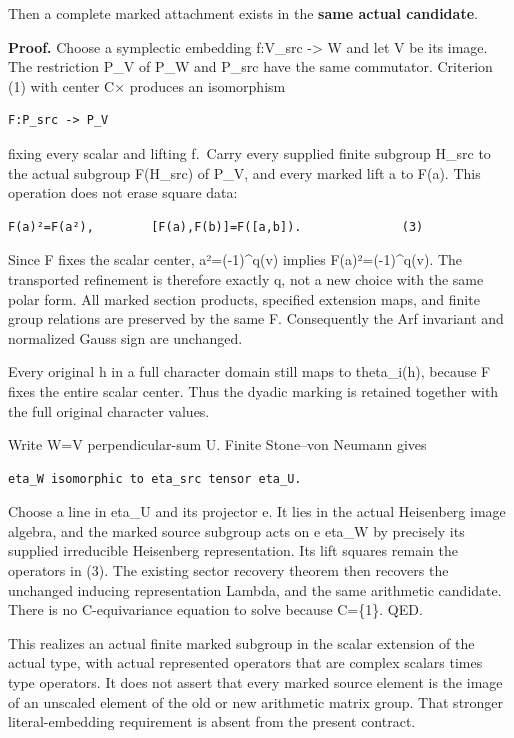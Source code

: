 Then a complete marked attachment exists in the \textbf{same actual
candidate}.

\textbf{Proof.} Choose a symplectic embedding f:V\_src -\textgreater{} W
and let V be its image. The restriction P\_V of P\_W and P\_src have the
same commutator. Criterion (1) with center C× produces an isomorphism

\begin{Verbatim}[fontsize=\small,breaklines=true,breakanywhere=true]
F:P_src -> P_V
\end{Verbatim}

fixing every scalar and lifting f.~Carry every supplied finite subgroup
H\_src to the actual subgroup F(H\_src) of P\_V, and every marked lift a
to F(a). This operation does not erase square data:

\begin{Verbatim}[fontsize=\small,breaklines=true,breakanywhere=true]
F(a)²=F(a²),        [F(a),F(b)]=F([a,b]).              (3)
\end{Verbatim}

Since F fixes the scalar center, a²=(-1)\^{}q(v) implies
F(a)²=(-1)\^{}q(v). The transported refinement is therefore exactly q,
not a new choice with the same polar form. All marked section products,
specified extension maps, and finite group relations are preserved by
the same F. Consequently the Arf invariant and normalized Gauss sign are
unchanged.

Every original h in a full character domain still maps to theta\_i(h),
because F fixes the entire scalar center. Thus the dyadic marking is
retained together with the full original character values.

Write W=V perpendicular-sum U. Finite Stone--von Neumann gives

\begin{Verbatim}[fontsize=\small,breaklines=true,breakanywhere=true]
eta_W isomorphic to eta_src tensor eta_U.
\end{Verbatim}

Choose a line in eta\_U and its projector e. It lies in the actual
Heisenberg image algebra, and the marked source subgroup acts on e
eta\_W by precisely its supplied irreducible Heisenberg representation.
Its lift squares remain the operators in (3). The existing sector
recovery theorem then recovers the unchanged inducing representation
Lambda, and the same arithmetic candidate. There is no C-equivariance
equation to solve because C=\{1\}. QED.

This realizes an actual finite marked subgroup in the scalar extension
of the actual type, with actual represented operators that are complex
scalars times type operators. It does not assert that every marked
source element is the image of an unscaled element of the old or new
arithmetic matrix group. That stronger literal-embedding requirement is
absent from the present contract.

